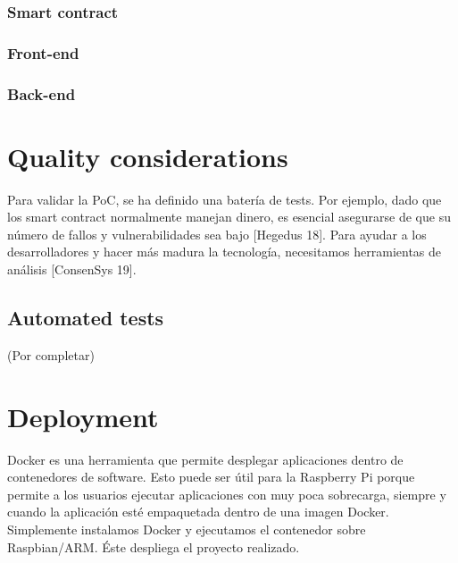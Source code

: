 \documentclass[12pt]{amsart}
\begin{document}
\begin{multicols}{2}



\vspace{0.35cm}

\subsubsection{Smart contract}
\subsubsection{Front-end} \label{ch:front-end}
\subsubsection{Back-end} \label{ch:back-end}



\section{Quality considerations}\label{sec:proofs}
Para validar la PoC, se ha definido una batería de tests. Por ejemplo, dado que los smart contract normalmente manejan dinero, es esencial asegurarse de que su número de fallos y vulnerabilidades sea bajo [Hegedus 18]. Para ayudar a los desarrolladores y hacer más madura la tecnología, necesitamos herramientas de análisis [ConsenSys 19].
\subsection{Automated tests} \label{ch:tests}
(Por completar)

\section{Deployment}\label{sec:deploy}
Docker es una herramienta que permite desplegar aplicaciones dentro de contenedores de software. Esto puede ser útil para la Raspberry Pi porque permite a los usuarios ejecutar aplicaciones con muy poca sobrecarga, siempre y cuando la aplicación esté empaquetada dentro de una imagen Docker. Simplemente instalamos Docker y ejecutamos el contenedor sobre Raspbian/ARM. Éste despliega el proyecto realizado.


\end{multicols}
\end{document}
